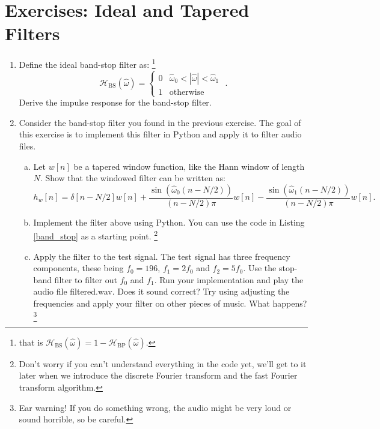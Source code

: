 \newpage
\section{Exercises: Ideal and Tapered Filters}

\begin{enumerate}
\item Define the ideal band-stop filter as: \footnote{that is $\mathcal{H}_{\mathrm{BS}}(\hat{\omega})=1 - \mathcal{H}_{\mathrm{BP}}(\hat{\omega})$.}
\begin{equation}
\mathcal{H}_{\mathrm{BS}}(\hat{\omega}) = \left\{ \begin{array}{cc}
0 & \hat{\omega}_0 < |\hat{\omega}| < \hat{\omega}_1 \\
1 & \mathrm{otherwise}
\end{array}\right.\,\,.
\end{equation}
Derive the impulse response for the band-stop filter.

\item Consider the band-stop filter you found in the previous exercise. The goal of this exercise is to implement this filter in Python and apply it to filter audio files.

\begin{enumerate}[a)]
\item Let $w[n]$ be a tapered window function, like the Hann window of length $N$. Show that the windowed filter can be written as:
$$h_{w}[n]=\delta[n-N/2]w[n] +  \frac{\sin(\hat{\omega}_{0}(n-N/2))}{(n-N/2)\pi}w[n] - \frac{\sin(\hat{\omega}_{1}(n-N/2))}{(n-N/2)\pi}w[n].$$

\item Implement the filter above using Python. You can use the code in Listing \ref{band_stop} as a starting point. 
\footnote{Don't worry if you can't understand everything in the code yet, we'll get to it later when we introduce the discrete Fourier transform and the fast Fourier transform algorithm.}


\item Apply the filter to the test signal. The test signal has three frequency components, these being $f_{0}=196$, $f_{1}=2f_{0}$ and $f_{2}=5f_{0}$. 
Use the stop-band filter to filter out $f_{0}$ and $f_{1}$. Run your implementation and play the audio file filtered.wav. 
Does it sound correct? Try using adjusting the frequencies and apply your filter on other pieces of music. What happens? 
\footnote{Ear warning! If you do something wrong, the audio might be very loud or sound horrible, so be careful.}

\end{enumerate}






\end{enumerate}
